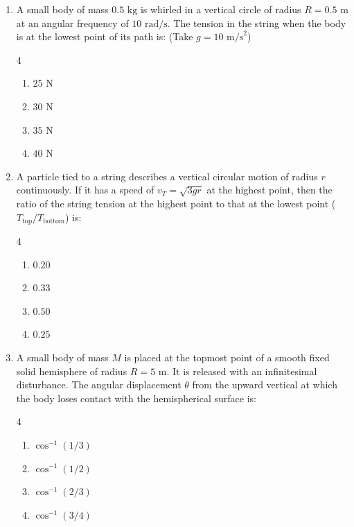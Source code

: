 \documentclass[11pt,a4paper]{article}
\begin{document}
\begin{enumerate}[label=\textbf{\arabic*.},leftmargin=18pt,itemsep=8pt,resume]
  \item A small body of mass $0.5\text{ kg}$ is whirled in a vertical circle of radius $R = 0.5\text{ m}$ at an angular frequency of $10\text{ rad/s}$. The tension in the string when the body is at the lowest point of its path is: (Take $g = 10\text{ m/s}^2$)
  \begin{multicols}{4}
    \begin{enumerate}[label=(\Alph*)]
      \item $25\text{ N}$
      \item $30\text{ N}$
      \item $35\text{ N}$
      \item $40\text{ N}$
    \end{enumerate}
  \end{multicols}

  \item A particle tied to a string describes a vertical circular motion of radius $r$ continuously. If it has a speed of $v_T = \sqrt{3gr}$ at the highest point, then the ratio of the string tension at the highest point to that at the lowest point ($T_{\text{top}}/T_{\text{bottom}}$) is:
  \begin{multicols}{4}
    \begin{enumerate}[label=(\Alph*)]
      \item $0.20$
      \item $0.33$
      \item $0.50$
      \item $0.25$
    \end{enumerate}
  \end{multicols}

  \item A small body of mass $M$ is placed at the topmost point of a smooth fixed solid hemisphere of radius $R = 5\text{ m}$. It is released with an infinitesimal disturbance. The angular displacement $\theta$ from the upward vertical at which the body loses contact with the hemispherical surface is:
  \begin{multicols}{4}
    \begin{enumerate}[label=(\Alph*)]
      \item $\cos^{-1}(1/3)$
      \item $\cos^{-1}(1/2)$
      \item $\cos^{-1}(2/3)$
      \item $\cos^{-1}(3/4)$
    \end{enumerate}
  \end{multicols}


\end{enumerate}
\end{document}
